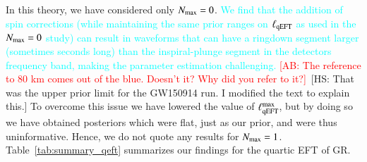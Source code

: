 \documentclass[twocolumn,
               prd,
               aps,
               superscriptaddress,
               tightenlines,
               nofootinbib,
               eqsecnum,
               amsfonts,
               amsmath,
               longbibliography]{revtex4-1}
\newcommand{\gm}{\mathfrak{m}}
\newcommand{\hscomm}[1]{{\textcolor{TealBlue}{{[HS: #1]}}}}
\newcommand{\ab}[1]{{\textcolor{cyan}{{#1}}}}
\newcommand{\abcomm}[1]{{\textcolor{red}{{[AB: #1]}}}}
\begin{document}
In this theory, we have considered only $N_{\rm max} = 0$.
%
\ab{We find that the addition of spin corrections (while maintaining the same prior ranges on $\ell_{\rm qEFT}$ as
used in the $N_{\rm max} = 0$ study)
can result in waveforms that can have a ringdown segment larger (sometimes seconds long) than the inspiral-plunge segment in the detectors frequency band, making the parameter estimation challenging.} \abcomm{The reference to 80 km comes out of the blue. Doesn't it? Why did you refer to it?}~\hscomm{That was the upper prior limit for the GW150914 run. I modified the text to explain this.}
%
To overcome this issue we have lowered the value of $\ell^{\rm max}_{\rm qEFT}$, but by doing so we have obtained posteriors
which were flat, just as our prior, and were thus uninformative. Hence, we do not quote any results for $N_{\rm max} = 1$.
%
Table~\ref{tab:summary_qeft} summarizes our findings for the quartic EFT of GR.
%
\end{document}
